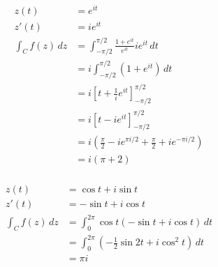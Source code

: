 \documentclass{article}
\begin{document}
\setcounter{subsubsection}{4}
\subsubsection{}

\begin{align*}
  z(t)              & = e^{i t}                                                                             \\
  z'(t)             & = i e^{i t}                                                                           \\
  \int_C f(z) \,d z & = \int_{-\pi / 2}^{\pi / 2} \frac{1 + e^{i t}}{e^{i t}} i e^{i t} \,d t               \\
                    & = i \int_{-\pi / 2}^{\pi / 2} (1 + e^{i t}) \,d t                                     \\
                    & = i \left[ t + \frac{1}{i} e^{i t} \right]_{-\pi / 2}^{\pi / 2}                       \\
                    & = i [t - i e^{i t}]_{-\pi / 2}^{\pi / 2}                                              \\
                    & = i \left( \frac{\pi}{2} - i e^{\pi i / 2} + \frac{\pi}{2} + i e^{-\pi i / 2} \right) \\
                    & = i (\pi + 2)
\end{align*}

\setcounter{subsubsection}{6}
\subsubsection{}

\begin{align*}
  z(t)              & = \cos t + i \sin t                                                      \\
  z'(t)             & = -\sin t + i \cos t                                                     \\
  \int_C f(z) \,d z & = \int_0^{2 \pi} \cos t (-\sin t + i \cos t) \,d t                       \\
                    & = \int_0^{2 \pi} \left( -\frac{1}{2} \sin 2 t + i \cos^2 t \right) \,d t \\
                    & = \pi i
\end{align*}

\setcounter{subsubsection}{8}
\subsubsection{}
\end{document}
